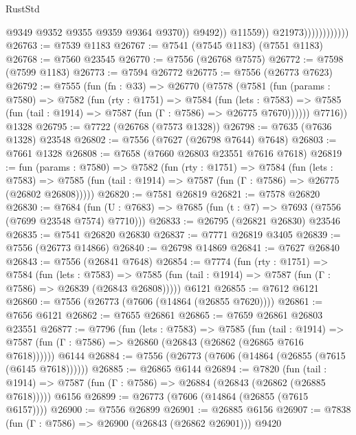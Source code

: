 \begin{lexlean}{RustStd}
\begin{coremodule}
                                        @9349
                                        @9352
                                        @9355
                                        @9359
                                        @9364
                                        @9370))
                                    @9492))
                                @11559))
                            @21973))))))))))))
@26763 := @7539 @1183
@26767 := @7541 (@7545 @1183) (@7551 @1183)
@26768 := @7560 @23545
@26770 := @7556 (@26768 @7575)
@26772 := @7598 (@7599 @1183)
@26773 := @7594 @26772
@26775 := @7556 (@26773 @7623)
@26792 := @7555
    (fun (fn : @33) =>
    @26770
      (@7578
        (@7581
          (fun (params : @7580) =>
          @7582
            (fun (rty : @1751) =>
            @7584
              (fun (lets : @7583) =>
              @7585 (fun (tail : @1914) => @7587 (fun (Γ : @7586) => @26775 @7670))))))
        @7716))
    @1328
@26795 := @7722 (@26768 (@7573 @1328))
@26798 := @7635 (@7636 @1328) @23548
@26802 := @7556 (@7627 (@26798 @7644) @7648)
@26803 := @7661 @1328
@26808 := @7658 (@7660 @26803 @23551 @7616 @7618)
@26819 := fun (params : @7580) =>
  @7582
    (fun (rty : @1751) =>
    @7584
      (fun (lets : @7583) =>
      @7585 (fun (tail : @1914) => @7587 (fun (Γ : @7586) => @26775 (@26802 @26808)))))
@26820 := @7581 @26819
@26821 := @7578 @26820
@26830 := @7684
    (fun (U : @7683) => @7685 (fun (t : @7) => @7693 (@7556 (@7699 @23548 @7574) @7710)))
@26833 := @26795 (@26821 @26830) @23546
@26835 := @7541 @26820 @26830
@26837 := @7771 @26819 @3405
@26839 := @7556 (@26773 @14866)
@26840 := @26798 @14869
@26841 := @7627 @26840
@26843 := @7556 (@26841 @7648)
@26854 := @7774
    (fun (rty : @1751) =>
    @7584
      (fun (lets : @7583) =>
      @7585 (fun (tail : @1914) => @7587 (fun (Γ : @7586) => @26839 (@26843 @26808)))))
    @6121
@26855 := @7612 @6121
@26860 := @7556 (@26773 (@7606 (@14864 (@26855 @7620))))
@26861 := @7656 @6121
@26862 := @7655 @26861
@26865 := @7659 @26861 @26803 @23551
@26877 := @7796
    (fun (lets : @7583) =>
    @7585
      (fun (tail : @1914) =>
      @7587 (fun (Γ : @7586) => @26860 (@26843 (@26862 (@26865 @7616 @7618))))))
    @6144
@26884 := @7556 (@26773 (@7606 (@14864 (@26855 (@7615 (@6145 @7618))))))
@26885 := @26865 @6144
@26894 := @7820
    (fun (tail : @1914) => @7587 (fun (Γ : @7586) => @26884 (@26843 (@26862 (@26885 @7618)))))
    @6156
@26899 := @26773 (@7606 (@14864 (@26855 (@7615 @6157))))
@26900 := @7556 @26899
@26901 := @26885 @6156
@26907 := @7838 (fun (Γ : @7586) => @26900 (@26843 (@26862 @26901))) @9420

\end{coremodule}
\end{lexlean}
